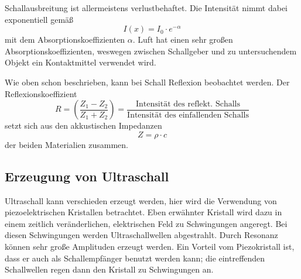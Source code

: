 \noindent
Schallausbreitung ist allermeistens verlustbehaftet. Die Intensität nimmt dabei exponentiell gemäß
\begin{equation}
	I(x) = I_0 \cdot e^{-\alpha}
\end{equation}
mit dem Absorptionskoeffizienten $\alpha$. Luft hat einen sehr großen Absorptionskoeffizienten, weswegen 
zwischen Schallgeber und zu untersuchendem Objekt ein Kontaktmittel verwendet wird.

\noindent
Wie oben schon beschrieben, kann bei Schall Reflexion beobachtet werden. Der Reflexionskoeffizient
\begin{equation}
	R = \left(\frac{Z_1 - Z_2}{Z_1 + Z_2} \right) 
	= \frac{\text{Intensität des reflekt. Schalls}}{\text{Intensität des einfallenden Schalls}}
\end{equation}
setzt sich aus den akkustischen Impedanzen 
\begin{equation}
	\label{eqn:impedanz}
	Z = \rho \cdot c
\end{equation}
der beiden Materialien zusammen.

\subsection{Erzeugung von Ultraschall}
\label{sec:Erzeugung von Ultraschall}

Ultraschall kann verschieden erzeugt werden, hier wird die Verwendung von piezoelektrischen Kristallen betrachtet. 
Eben erwähnter Kristall wird dazu in einem zeitlich veränderlichen, elektrischen Feld zu Schwingungen angeregt.
Bei diesen Schwingungen werden Ultraschallwellen abgestrahlt. Durch Resonanz können sehr große Amplituden erzeugt
werden. Ein Vorteil vom Piezokristall ist, dass er auch als Schallempfänger benutzt werden kann; die eintreffenden
Schallwellen regen dann den Kristall zu Schwingungen an.

